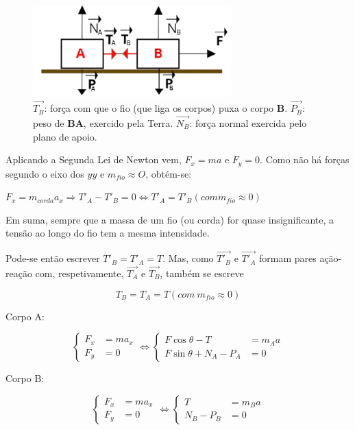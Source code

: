 \documentclass[a4paper,11pt,oneside]{report}
\begin{document}
\begin{figure}[H]
    \centerline{}
    \center
    \includegraphics[height=100pt]{figuras/dabm.png}
    \caption{$\vec {T_B}$: força com que o fio (que liga os corpos) puxa o 
    corpo \textbf{B}. $\vec {P_B}$: peso de \textbf{BA}, exercido pela Terra. 
    $\vec {N_B}$: força normal exercida pelo plano de apoio.}
    \label{fig:corpo12}
\end{figure}


Aplicando a Segunda Lei de Newton vem, $F_x = ma$ e $F_y = 0$. Como não há forças 
segundo o eixo dos $yy$ e $m_{fio} \approx O$, obtém-se:

$F_x = m_{corda}a_x \Rightarrow T'_A - T'_B = 0 \Leftrightarrow T'_A = T'_B (com m_{fio} \approx 0)$

Em suma, sempre que a massa de um fio (ou corda) for quase insignificante, a tensão 
ao longo do fio tem a mesma intensidade.

Pode-se então escrever $T'_B = T'_A = T$. Mas, como $\vec{T'_B}$ e $\vec{T'_A}$ formam 
pares ação-reação com, respetivamente, $\vec{T_A}$ e $\vec{T_B}$, também se escreve

\[
T_B = T_A = T (com \ m_{fio}\approx0)
\]

\noindent \hrulefill
\begin{center}
    Corpo A:
\end{center}
\[
\left\{
\begin{array}{cl}
F_x & = ma_x \\
F_y & = 0
\end{array}
\Leftrightarrow
\right.
\left\{
\begin{array}{cl}
F \cos\theta - T & = m_Aa \\
F \sin \theta + N_A - P_A & = 0
\end{array}
\right.
\]
\begin{center}
    Corpo B:
\end{center}
\[
\left\{
\begin{array}{cl}
F_x & = ma_x \\
F_y & = 0
\end{array}
\Leftrightarrow
\right.
\left\{
\begin{array}{cl}
T & = m_Ba \\
N_B - P_B & = 0
\end{array}
\right.
\]
\hrulefill
\end{document}
